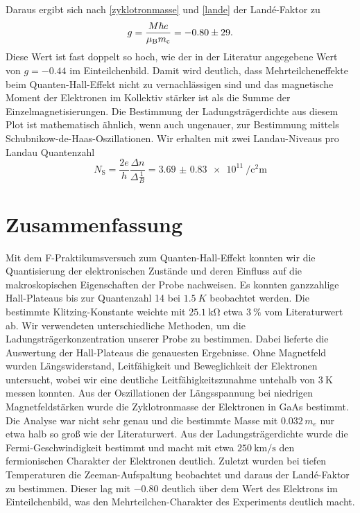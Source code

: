 \documentclass[paper=a4,fontsize=10pt,DIV=18,twocolumn,parskip=half]{scrartcl}
\numberwithin{equation}{section}    %
\begin{document}
Daraus ergibt sich nach \eqref{zyklotronmasse} und \eqref{lande} der Landé-Faktor zu
\begin{equation}
g=\frac{M \hbar e}{\mu_{\rm B} m_{\rm c}}=-0.80\pm29.
\end{equation}
Diese Wert ist fast doppelt so hoch, wie der in der Literatur \citep{anleitung} angegebene Wert von $g=-0.44$ im Einteilchenbild. Damit wird deutlich, dass Mehrteilcheneffekte beim Quanten-Hall-Effekt nicht zu vernachlässigen sind und das magnetische Moment der Elektronen im Kollektiv stärker ist als die Summe der Einzelmagnetisierungen.
Die Bestimmung der Ladungsträgerdichte aus diesem Plot ist mathematisch ähnlich, wenn auch ungenauer, zur Bestimmung mittels Schubnikow-de-Haas-Oszillationen.
Wir erhalten mit zwei Landau-Niveaus pro Landau Quantenzahl
\begin{equation}
N_\mathrm{S}=\frac{2e}{h}\frac{\Delta n}{\Delta \frac{1}{B}}=\SI{3.69(083)e11}{\per\square\centi\meter}
\end{equation}

\section{Zusammenfassung}
\label{Zusammenfassung}

Mit dem F-Praktikumsversuch zum Quanten-Hall-Effekt konnten wir die Quantisierung
der elektronischen Zustände und deren Einfluss auf die makroskopischen Eigenschaften 
der Probe nachweisen. Es konnten ganzzahlige Hall-Plateaus bis zur Quantenzahl 14 bei 
$\SI{1.5}{K}$ beobachtet werden. Die bestimmte Klitzing-Konstante weichte 
mit $\SI{25.1}{\kilo\ohm}$ etwa $\SI{3}{\percent}$ vom Literaturwert ab.
Wir verwendeten unterschiedliche Methoden, um die Ladungsträgerkonzentration unserer
Probe zu bestimmen. Dabei lieferte die Auswertung der Hall-Plateaus die genauesten 
Ergebnisse. Ohne Magnetfeld wurden Längswiderstand, Leitfähigkeit und Beweglichkeit 
der Elektronen untersucht, wobei wir eine deutliche Leitfähigkeitszunahme untehalb von 
$\SI{3}{\kelvin}$ messen konnten. Aus der Oszillationen der Längsspannung bei niedrigen 
Magnetfeldstärken wurde die Zyklotronmasse der Elektronen in GaAs bestimmt. Die 
Analyse war nicht sehr genau und die bestimmte Masse mit $0.032\,m_e$ nur etwa halb 
so groß wie der Literaturwert. Aus der Ladungsträgerdichte wurde die Fermi-Geschwindigkeit 
bestimmt und macht mit etwa $\SI[per-mode=symbol]{250}{\kilo\meter\per\second}$ den fermionischen Charakter
der Elektronen deutlich. Zuletzt wurden bei tiefen Temperaturen die Zeeman-Aufspaltung 
beobachtet und daraus der Landé-Faktor zu bestimmen. Dieser lag mit $-0.80$ deutlich über
dem Wert des Elektrons im Einteilchenbild, was den Mehrteilchen-Charakter des Experiments
deutlich macht.
\end{document}
